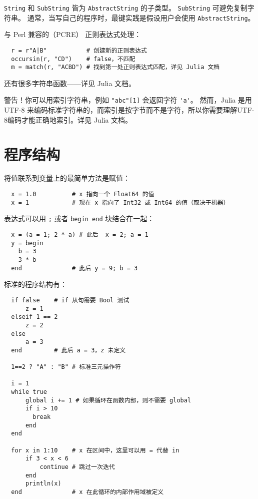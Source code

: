 \documentclass[10pt,a4paper]{article}
\begin{document}
\lstinline|String| 和 \lstinline|SubString| 皆为 \lstinline|AbstractString| 的子类型。
\lstinline|SubString| 可避免复制字符串。
通常，当写自己的程序时，最键实践是假设用户会使用 \lstinline|AbstractString|。

与 Perl 兼容的（PCRE） 正则表达式处理：
\begin{lstlisting}
  r = r"A|B"           # 创建新的正则表达式
  occursin(r, "CD")    # false，不匹配
  m = match(r, "ACBD") # 找到第一处正则表达式匹配，详见 Julia 文档
\end{lstlisting}

还有很多字符串函数——详见 Julia 文档。

警告！你可以用索引字符串，例如 \lstinline|"abc"[1]| 会返回字符 \lstinline|'a'|。
然而，Julia 是用 UTF-8 来编码标准字符串的，而索引是按字节而不是字符，所以你需要理解UTF-8编码才能正确地索引。详见 Julia 文档。

\section{程序结构}
将值联系到变量上的最简单方法是赋值：
\begin{lstlisting}
  x = 1.0          # x 指向一个 Float64 的值
  x = 1            # 现在 x 指向了 Int32 或 Int64 的值（取决于机器）
\end{lstlisting}

表达式可以用 \lstinline|;| 或者 \lstinline|begin end| 块结合在一起：
\begin{lstlisting}
  x = (a = 1; 2 * a) # 此后  x = 2; a = 1
  y = begin
    b = 3
    3 * b
  end              # 此后 y = 9; b = 3
\end{lstlisting}

标准的程序结构有：
\begin{lstlisting}
  if false    # if 从句需要 Bool 测试
      z = 1
  elseif 1 == 2
      z = 2
  else
      a = 3
  end         # 此后 a = 3，z 未定义

  1==2 ? "A" : "B" # 标准三元操作符

  i = 1
  while true
      global i += 1 # 如果循环在函数内部，则不需要 global
      if i > 10
        break
      end
  end

  for x in 1:10    # x 在区间中，这里可以用 = 代替 in
      if 3 < x < 6
          continue # 跳过一次迭代
      end
      println(x)
  end              # x 在此循环的内部作用域被定义
\end{lstlisting}
\end{document}
